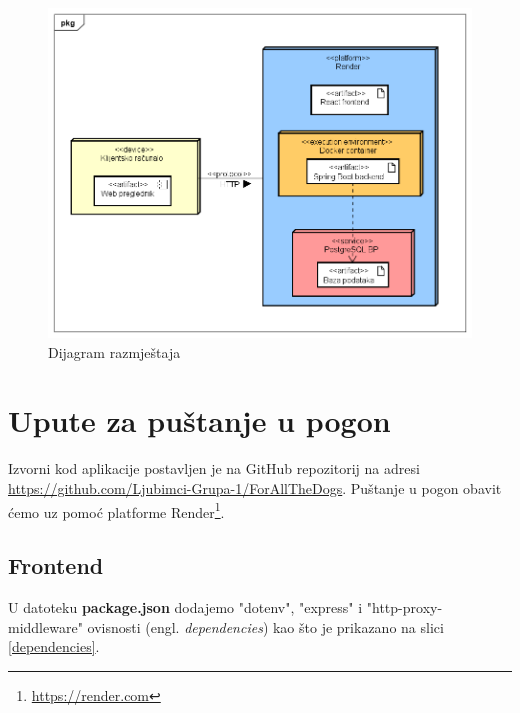 			 \begin{figure}[H]
				\includegraphics[scale=0.6]{slike/dijagram_razmjestaja.PNG} 
				\centering
				\caption{Dijagram razmještaja}
				\label{dijagram_razmjestaja}
			\end{figure}
			
			\eject 
		
		\section{Upute za puštanje u pogon}
		
			Izvorni kod aplikacije postavljen je na GitHub repozitorij na adresi \url{https://github.com/Ljubimci-Grupa-1/ForAllTheDogs}. Puštanje u pogon obavit ćemo uz pomoć platforme Render\footnote{\url{https://render.com}}.
			
			\subsection{Frontend}
			
			U datoteku \textbf{package.json} dodajemo "dotenv", "express" i "http-proxy-middleware" ovisnosti (engl. \textit{dependencies}) kao što je prikazano na slici \ref{dependencies}.
			
